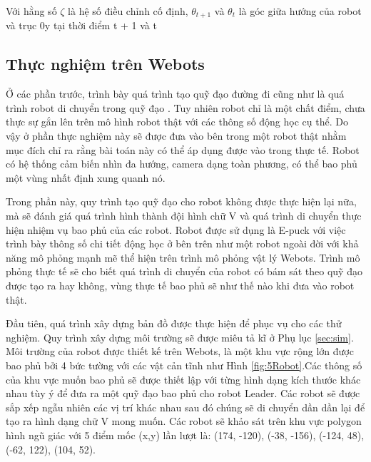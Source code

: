 Với hằng số $\zeta$ là hệ số điều chỉnh cố định, $\theta_{t+1}$ và $ \theta_{t}$
là góc giữa hướng của robot
và trục 0y tại thời điểm t + 1 và t


\subsection{Thực nghiệm trên Webots}

Ở các phần trước, trình bày quá trình tạo quỹ đạo đường đi cũng như là quá trình robot di chuyển trong quỹ đạo . Tuy nhiên robot chỉ là một chất điểm, chưa thực sự gắn lên trên mô hình robot thật với các thông số động học cụ thể. Do vậy ở phần thực nghiệm này sẽ được đưa vào bên trong một robot thật nhằm mục đích chỉ ra rằng bài toán này có thể áp dụng được vào trong thực tế. Robot có hệ thống cảm biến nhìn đa hướng, camera dạng toàn phương, có thể bao phủ một vùng nhất định xung quanh nó.

Trong phần này, quy trình tạo quỹ đạo cho robot không được thực hiện lại nữa, mà sẽ đánh giá quá trình hình thành đội hình chữ V và quá trình di chuyển thực hiện nhiệm vụ bao phủ của các robot. Robot được sử dụng là E-puck với việc trình bày thông số chi tiết động học ở bên trên như một robot ngoài đời với khả năng mô phỏng mạnh mẽ thể hiện trên trình mô phỏng vật lý Webots. Trình mô phỏng thực tế sẽ cho biết quá trình di chuyển của robot có bám sát theo quỹ đạo được tạo ra hay không, vùng thực tế bao phủ sẽ như thế nào khi đưa vào robot thật.

Đầu tiên, quá trình xây dựng bản đồ được thực hiện để phục vụ cho các thử nghiệm. Quy trình xây dựng môi trường sẽ được miêu tả kĩ ở Phụ lục \ref{sec:sim}. Môi trường của robot được thiết kế trên Webots, là một khu vực rộng lớn được bao phủ bởi 4 bức tường với các vật cản tĩnh như Hình \ref{fig:5Robot}.Các thông số của khu vực muốn bao phủ sẽ được thiết lập với từng hình dạng kích thước khác nhau tùy ý để đưa ra một quỹ đạo bao phủ cho robot Leader. Các robot sẽ được sắp xếp ngẫu nhiên các vị trí khác nhau sau đó chúng sẽ di chuyển dần dần lại để tạo ra hình dạng chữ V mong muốn. Các robot sẽ khảo sát trên khu vực polygon hình ngũ giác với 5 điểm mốc (x,y) lần lượt là: (174, -120), (-38, -156), (-124, 48), (-62, 122), (104, 52).


